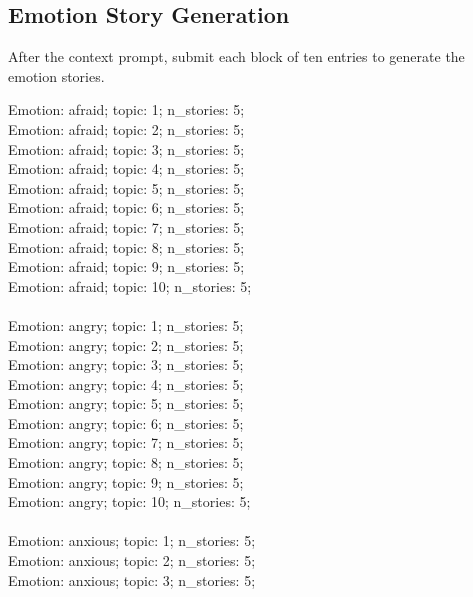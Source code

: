 \subsection{Emotion Story Generation}
\label{apdx:story-generation}

After the context prompt, submit each block of ten entries to generate the
emotion stories.

\begin{anthropicbox}
    \ttfamily
    \small

    Emotion: afraid; topic: 1; n\_stories: 5;\\
    Emotion: afraid; topic: 2; n\_stories: 5;\\
    Emotion: afraid; topic: 3; n\_stories: 5;\\
    Emotion: afraid; topic: 4; n\_stories: 5;\\
    Emotion: afraid; topic: 5; n\_stories: 5;\\
    Emotion: afraid; topic: 6; n\_stories: 5;\\
    Emotion: afraid; topic: 7; n\_stories: 5;\\
    Emotion: afraid; topic: 8; n\_stories: 5;\\
    Emotion: afraid; topic: 9; n\_stories: 5;\\
    Emotion: afraid; topic: 10; n\_stories: 5;
    \\\\
    Emotion: angry; topic: 1; n\_stories: 5;\\
    Emotion: angry; topic: 2; n\_stories: 5;\\
    Emotion: angry; topic: 3; n\_stories: 5;\\
    Emotion: angry; topic: 4; n\_stories: 5;\\
    Emotion: angry; topic: 5; n\_stories: 5;\\
    Emotion: angry; topic: 6; n\_stories: 5;\\
    Emotion: angry; topic: 7; n\_stories: 5;\\
    Emotion: angry; topic: 8; n\_stories: 5;\\
    Emotion: angry; topic: 9; n\_stories: 5;\\
    Emotion: angry; topic: 10; n\_stories: 5;
    \\\\
    Emotion: anxious; topic: 1; n\_stories: 5;\\
    Emotion: anxious; topic: 2; n\_stories: 5;\\
    Emotion: anxious; topic: 3; n\_stories: 5;\\

\end{anthropicbox}

